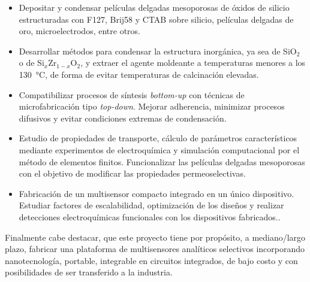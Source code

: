 	\begin{itemize}
		
		\item Depositar y condensar películas delgadas mesoporosas de óxidos de silicio estructuradas con F127, Brij58 y CTAB sobre silicio, películas delgadas de oro, microelectrodos, entre otros.  
		
		\item Desarrollar métodos para condensar la estructura inorgánica, ya sea de SiO$_2$ o de Si$_{x}$Zr$_{1-x}$O$_2$, y extraer el agente moldeante a temperaturas menores a los \SI{130}{\celsius}, de forma de evitar temperaturas de calcinación elevadas.

		\item Compatibilizar procesos de síntesis \textit{bottom-up} con técnicas de microfabricación tipo \textit{top-down}. Mejorar adherencia, minimizar procesos difusivos y evitar condiciones extremas de condensación.

		\item Estudio de propiedades de transporte, cálculo de parámetros característicos mediante experimentos de electroquímica y simulación computacional por el método de elementos finitos. Funcionalizar las películas delgadas mesoporosas con el objetivo de modificar las propiedades permeoselectivas.

		\item Fabricación de un multisensor compacto integrado en un único dispositivo. Estudiar factores de escalabilidad, optimización de los diseños y realizar detecciones electroquímicas funcionales con los dispositivos fabricados..

		\end{itemize}	

	Finalmente cabe destacar, que este proyecto tiene por propósito, a mediano/largo plazo, fabricar una plataforma de multisensores analíticos selectivos incorporando nanotecnología, portable, integrable en circuitos integrados, de bajo costo y con posibilidades de ser transferido a la industria.